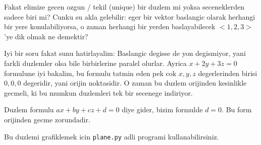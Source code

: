 \documentclass[12pt,fleqn]{article}
\begin{document}
Fakat elimize gecen ozgun / tekil (unique) bir duzlem mi yoksa
seceneklerden sadece biri mi? Cunku su akla gelebilir: eger bir vektor
baslangic olarak herhangi bir yere konulabiliyorsa, o zaman herhangi bir
yerden baslayabilecek $<1,2,3>$'ye dik olmak ne demektir? 

Iyi bir soru fakat sunu hatirlayalim: Baslangic degisse de yon degismiyor,
yani farkli duzlemler olsa bile birbirlerine paralel olurlar. Ayrica $x +
2y + 3z = 0$ 
formulune iyi bakalim, bu formulu tatmin eden pek cok $x,y,z$
degerlerinden birisi $0,0,0$ degeridir, yani orijin noktasidir. O zaman bu duzlem
orijinden kesinlikle gecmeli, ki bu mumkun duzlemleri tek bir secenege
indiriyor. 

Duzlem formulu $ax + by + cz + d= 0$ diye gider, bizim formulde $d=0$. Bu
form orijinden gecme zorundadir.

Bu duzlemi grafiklemek icin \verb!plane.py! adli programi kullanabilirsiniz.
\end{document}
